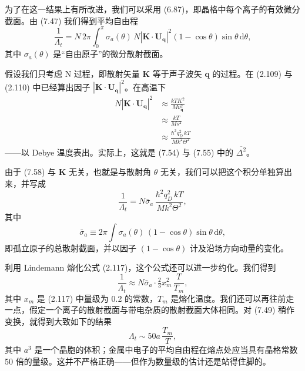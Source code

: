 为了在这一结果上有所改进，我们可以采用 (6.87)，即晶格中每个离子的有效微分截面。由 (7.47) 我们得到平均自由程
\begin{equation*}
\frac{1}{\Lambda_{t}}=N\,2\pi\int_{0}^{\pi}\sigma_{a}(\theta)\,N|\mathbf{K}\cdot\mathbf{U}_{\mathbf{q}}|^{2}(1-\cos\theta)\sin\theta\,\mathrm{d}\theta,\tag{7.57}
\end{equation*}
其中 $\sigma_{a}(\theta)$ 是“自由原子”的微分散射截面。

假设我们只考虑 N 过程，即散射矢量 $\mathbf{K}$ 等于声子波矢 $\mathbf{q}$ 的过程。在 (2.109) 与 (2.110) 中已经算出因子 $|\mathbf{K}\cdot\mathbf{U}_{\mathbf{q}}|^{2}$。在高温下
\begin{align*}
N|\mathbf{K}\cdot\mathbf{U}_{\mathbf{q}}|^{2}&\approx\frac{kTK^{2}}{M\nu_{\mathbf{q}}^{2}}\\
&\approx\frac{kT}{Ms^{2}}\\
&\approx\frac{\hbar^{2}q_{D}^{2}\,kT}{Mk^{2}\Theta^{2}}\tag{7.58}
\end{align*}
——以 Debye 温度表出。实际上，这就是 (7.54) 与 (7.55) 中的 $\overline{\Delta^{2}}$。

由于 (7.58) 与 $\mathbf{K}$ 无关，也就是与散射角 $\theta$ 无关，我们可以把这个积分单独算出来，并写成
\begin{equation*}
\frac{1}{\Lambda_{t}}=N\bar{\sigma}_{a}\,\frac{\hbar^{2}q_{D}^{2}\,kT}{Mk^{2}\Theta^{2}},\tag{7.59}
\end{equation*}
其中
\begin{equation*}
\bar{\sigma}_{a}\equiv 2\pi\int\sigma_{a}(\theta)\,(1-\cos\theta)\sin\theta\,\mathrm{d}\theta,\tag{7.60}
\end{equation*}
即孤立原子的总散射截面，并以因子 $(1-\cos\theta)$ 计及沿场方向动量的变化。

利用 Lindemann 熔化公式 (2.117)，这个公式还可以进一步约化。我们得到
\begin{equation*}
\frac{1}{\Lambda_{t}}\approx N\bar{\sigma}_{a}\cdot\tfrac{2}{3}x_{m}^{2}\,\frac{T}{T_{m}},\tag{7.61}
\end{equation*}
其中 $x_{m}$ 是 (2.117) 中量级为 0.2 的常数，$T_{m}$ 是熔化温度。我们还可以再往前走一点，假定一个离子的散射截面与带电杂质的散射截面大体相同。对 (7.49) 稍作变换，就得到大致如下的结果
\begin{equation*}
\Lambda_{t}\sim 50a\,\frac{T_{m}}{T},\tag{7.62}
\end{equation*}
其中 $a^{3}$ 是一个晶胞的体积；金属中电子的平均自由程在熔点处应当具有晶格常数 50 倍的量级。这并不严格正确——但作为数量级的估计还是站得住脚的。


